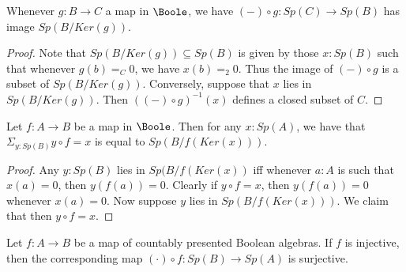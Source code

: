 \begin{lemma}
  Whenever $g:B\to C$ a map in $\Boole$, we have 
  $(-)\circ g : Sp(C) \to Sp(B)$ has image 
  $Sp(B/Ker(g))$. 
\end{lemma}
\begin{proof}
  Note that $Sp(B/Ker(g))\subseteq Sp(B)$  is given by those $x:Sp(B)$ such that whenever $g(b) =_C 0$, we have $x(b) =_2 0$. 
  Thus the image of $(-)\circ g$ is a subset of $Sp(B/Ker(g))$.
  Conversely, suppose that $x$ lies in $Sp(B/Ker(g))$. 
  Then $((-)\circ g)^{-1}(x)$ defines a closed subset of $C$. 
\end{proof}

\begin{lemma}
  Let $f:A \to B$ be a map in $\Boole$. 
  Then for any $x:Sp(A)$, we have that $\Sigma_{y:Sp(B)} y\circ f = x$ is equal to 
  $Sp(B/f(Ker(x)))$. 
\end{lemma}
\begin{proof}
  Any $y:Sp(B)$ lies in $Sp(B/f(Ker(x))$ iff whenever $a:A$ is such that $x(a) = 0$, then $y(f(a)) = 0$. 
  Clearly if $y\circ f = x$, then $y(f(a)) = 0$ whenever $x(a) = 0$. 
  Now suppose $y$ lies in $Sp(B/f(Ker(x)))$. 
  We claim that then $y\circ f = x$. 
\end{proof}


\begin{theorem}\label{FormalSurjectionsAreSurjections}
  Let $f:A\to B$ be a map of countably presented Boolean algebras. 
  If $f$ is injective, then the corresponding map $(\cdot) \circ f : Sp(B) \to Sp(A)$ is surjective. 
\end{theorem}

